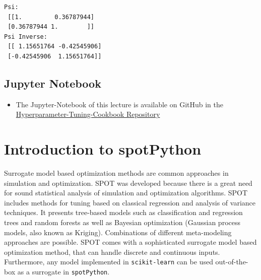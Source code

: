 \documentclass[
  letterpaper,
  DIV=11,
  numbers=noendperiod]{scrreprt}
\providecommand{\tightlist}{%
  \setlength{\itemsep}{0pt}\setlength{\parskip}{0pt}}\usepackage{longtable,booktabs,array}
\begin{document}
\begin{verbatim}
Psi:
 [[1.         0.36787944]
 [0.36787944 1.        ]]
Psi Inverse:
 [[ 1.15651764 -0.42545906]
 [-0.42545906  1.15651764]]
\end{verbatim}

\section{Jupyter Notebook}\label{jupyter-notebook-5}

\begin{tcolorbox}[enhanced jigsaw, rightrule=.15mm, coltitle=black, title=\textcolor{quarto-callout-note-color}{\faInfo}\hspace{0.5em}{Note}, opacitybacktitle=0.6, bottomrule=.15mm, opacityback=0, left=2mm, colback=white, leftrule=.75mm, colframe=quarto-callout-note-color-frame, colbacktitle=quarto-callout-note-color!10!white, toprule=.15mm, toptitle=1mm, bottomtitle=1mm, titlerule=0mm, breakable, arc=.35mm]

\begin{itemize}
\tightlist
\item
  The Jupyter-Notebook of this lecture is available on GitHub in the
  \href{https://github.com/sequential-parameter-optimization/Hyperparameter-Tuning-Cookbook/blob/main/006_num_gp.ipynb}{Hyperparameter-Tuning-Cookbook
  Repository}
\end{itemize}

\end{tcolorbox}

\chapter{Introduction to spotPython}\label{sec-spot}

Surrogate model based optimization methods are common approaches in
simulation and optimization. SPOT was developed because there is a great
need for sound statistical analysis of simulation and optimization
algorithms. SPOT includes methods for tuning based on classical
regression and analysis of variance techniques. It presents tree-based
models such as classification and regression trees and random forests as
well as Bayesian optimization (Gaussian process models, also known as
Kriging). Combinations of different meta-modeling approaches are
possible. SPOT comes with a sophisticated surrogate model based
optimization method, that can handle discrete and continuous inputs.
Furthermore, any model implemented in \texttt{scikit-learn} can be used
out-of-the-box as a surrogate in \texttt{spotPython}.
\end{document}
